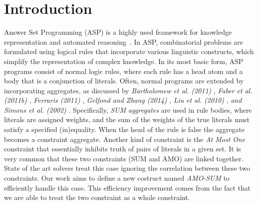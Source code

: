 \chapter{Introduction}
Answer Set Programming (ASP) is a highly used framework for knowledge 
representation and automated reasoning~\cite{MarekT99,Niemela99,DBLP:journals/cacm/BrewkaET11,GelfondL90}. 
In ASP, combinatorial problems are formulated using logical rules that incorporate various
linguistic constructs, which simplify the representation of complex knowledge.
In its most basic form, ASP programs consist of normal logic rules, where each rule 
has a head atom and a body that is a conjunction of literals. 
Often, normal programs are extended by incorporating aggregates, as discussed by 
\textit{Bartholomew et al. (2011)} \cite{DBLP:conf/aaaiss/BartholomewLM11}, \textit{Faber et al. (2011b)}
\cite{DBLP:journals/ai/FaberPL11}, \textit{Ferraris (2011)} \cite{DBLP:journals/tocl/Ferraris11},
\textit{Gelfond and Zhang (2014)} \cite{DBLP:journals/tplp/GelfondZ14},
\textit{Liu et al. (2010)} \cite{DBLP:journals/ai/LiuPST10},\textit{ and Simons et al. (2002)}
\cite{DBLP:journals/ai/LiuPST10}.
Specifically, \textit{SUM aggregates} are used in rule 
bodies, where literals are assigned weights, 
and the sum of the weights of the true literals must satisfy a specified (in)equality.
When the head of the rule is false the aggregate becomes a constraint aggregate.
Another kind of constraint is the \textit{At Most One} constraint
that essentially inhibits truth of pairs of literals in a given set.
It is very common that these two constraints (SUM and AMO) are linked together.
State of the art solvers treat this case ignoring the correlation between these two constraints. 
Our work aims to define a new costruct named \textit{AMO-SUM} to efficiently handle this case.
This efficiency improvement comes from the fact that we are able to treat the two constraint
as a whole constraint.


